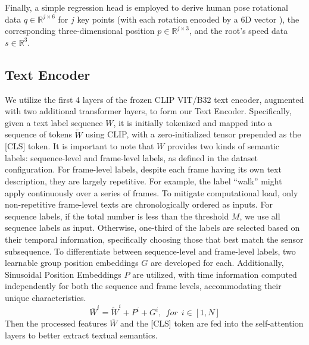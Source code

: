 \documentclass[letterpaper]{article} %
\begin{document}
Finally, a simple regression head is employed to derive human pose rotational data $q \in \mathbb{R}^{j\times6}$ for $j$ key points (with each rotation encoded by a 6D vector \cite{zhou2019continuity}), the corresponding three-dimensional position $p \in \mathbb{R}^{j\times3}$, and the root's speed data $s \in \mathbb{R}^{3}$.

\subsection{Text Encoder}
We utilize the first 4 layers of the frozen CLIP \cite{radford2021learning} VIT/B32 text encoder, augmented with two additional transformer layers, to form our Text Encoder. Specifically, given a text label sequence $W$, it is initially tokenized and mapped into a sequence of tokens $\widetilde{W}$ using CLIP, with a zero-initialized tensor prepended as the [CLS] token. It is important to note that $W$ provides two kinds of semantic labels: sequence-level and frame-level labels, as defined in the dataset configuration. For frame-level labels, despite each frame having its own text description, they are largely repetitive. For example, the label ``walk'' might apply continuously over a series of frames. To mitigate computational load, only non-repetitive frame-level texts are chronologically ordered as inputs. For sequence labels, if the total number is less than the threshold $M$, we use all sequence labels as input. Otherwise, one-third of the labels are selected based on their temporal information, specifically choosing those that best match the sensor subsequence.
To differentiate between sequence-level and frame-level labels, two learnable group position embeddings \(G\) are developed for each. Additionally, Sinusoidal Position Embeddings \cite{vaswani2017attention}
\(P\) are utilized, with time information computed independently for both the sequence and frame levels, accommodating their unique characteristics.
\begin{equation}
     \overline{W}^{i} = \widetilde{W}^i+P^i +G^{i}, ~~ for~~ i\in [1,N]
\end{equation}
Then the processed features $\overline{W}$ and the [CLS] token are fed into the self-attention layers to better extract textual semantics.
\end{document}
